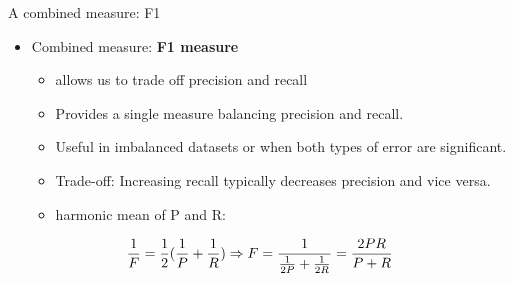 \documentclass[serif, aspectratio=169]{beamer}
\begin{document}
\begin{frame}{A combined measure: F1}
    \begin{itemize}
        \item Combined measure: \textbf{F1 measure}
        \begin{itemize}
            \item allows us to trade off precision and recall
            \item Provides a single measure balancing precision and recall.
            \item Useful in imbalanced datasets or when both types of error are significant.
            \item Trade-off: Increasing recall typically decreases precision and vice versa.
            \item harmonic mean of P and R:
        \end{itemize}
    \end{itemize}
    
    \begin{align*}
        \frac{1}{F}=\frac{1}{2}(\frac{1}{P}+\frac{1}{R})\newline
        \Rightarrow F = \frac{1}{\frac{1}{2P} + \frac{1}{2R}} = \frac{2PR}{P + R}
    \end{align*}
    
\end{frame}
\end{document}
